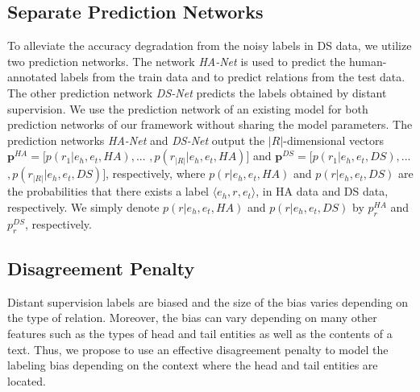 \documentclass[11pt]{article}
\newcommand{\triple}[3]{\ensuremath{\langle #1,#2,#3\rangle}}
\newcommand{\hanet}{\emph{HA-Net}\xspace}
\newcommand{\dsnet}{\emph{DS-Net}\xspace}
\newcommand{\ehead}{e_{h}}
\newcommand{\etail}{e_{t}}
\newcommand{\vect}[1]{\boldsymbol{\mathbf{#1}}}
\begin{document}
\subsection{Separate Prediction Networks}
To alleviate the accuracy degradation from the noisy labels in DS data, we utilize two prediction networks.
The network \hanet is used to predict the human-annotated labels from the train data and to predict relations from the test data.
The other prediction network  \dsnet predicts the labels obtained by distant supervision.
We use the prediction network of an existing model for both prediction networks of our framework without sharing the model parameters.
The prediction networks \hanet and \dsnet output the $|R|$-dimensional vectors $\vect{p}^{HA}=[p(r_1|\ehead,\etail,HA),...$ $,p(r_{|R|}|\ehead,\etail,HA)]$ and $\vect{p}^{DS} = [p(r_1|\ehead,\etail,DS),...$ $,p(r_{|R|}|\ehead,\etail,DS)]$, respectively, where $p(r|\ehead,\etail,HA)$ and $p(r|\ehead,\etail,DS)$ are the probabilities that there exists a label \triple{\ehead}{r}{\etail}, in HA data and DS data, respectively. 
We simply denote $p(r|\ehead,\etail,HA)$ and $p(r|\ehead,\etail,DS)$ by $p_r^{HA}$ and $p_r^{DS}$, respectively.









\subsection{Disagreement Penalty}
Distant supervision labels are biased and the size of the bias varies depending on the type of relation.
Moreover, the bias can vary depending on many other features such as the types of head and tail entities as well as the contents of a text.
Thus, we propose to use an effective disagreement penalty to model the labeling bias depending on the context where the head and tail entities are located.
\end{document}
